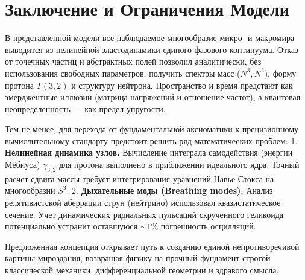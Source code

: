 \documentclass[12pt,a4paper]{article}
\begin{document}
\section*{Заключение и Ограничения Модели}

В представленной модели все наблюдаемое многообразие микро- и макромира выводится из нелинейной эластодинамики единого фазового континуума. Отказ от точечных частиц и абстрактных полей позволил аналитически, без использования свободных параметров, получить спектры масс ($N^3, N^2$), форму протона $T(3,2)$ и структуру нейтрона. Пространство и время предстают как эмерджентные иллюзии (матрица напряжений и отношение частот), а квантовая неопределенность — как предел упругости.

Тем не менее, для перехода от фундаментальной аксиоматики к прецизионному вычислительному стандарту предстоит решить ряд математических проблем:
1. \textbf{Нелинейная динамика узлов.} Вычисление интеграла самодействия (энергии Мёбиуса) $\gamma_{3,2}$ для протона выполнено в приближении идеального ядра. Точный расчет сдвига массы требует интегрирования уравнений Навье-Стокса на многообразии $S^3$.
2. \textbf{Дыхательные моды (Breathing modes).} Анализ релятивистской аберрации струн (нейтрино) использовал квазистатическое сечение. Учет динамических радиальных пульсаций скрученного геликоида потенциально устранит оставшуюся $\sim 1\%$ погрешность осцилляций.

Предложенная концепция открывает путь к созданию единой непротиворечивой картины мироздания, возвращая физику на прочный фундамент строгой классической механики, дифференциальной геометрии и здравого смысла.
\end{document}
